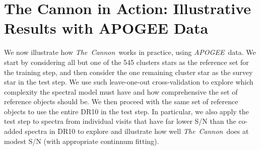 \documentclass[12pt, preprint]{aastex}
\newcommand{\tc}{\textsl{The~Cannon}}
\newcommand{\apogee}{\textsl{APOGEE}}
\begin{document}
\section{The Cannon in Action: Illustrative Results with APOGEE Data}
\label{sec:results}


We now illustrate how \tc\ works in practice, using \apogee\  data.
We start by considering all but one of the 545 clusters stars as the reference set for the training step, and then consider the one remaining cluster star as the survey star in the test step. We use such leave-one-out cross-validation to explore which complexity the spectral model must have and how comprehensive the set of reference objects should be. We then proceed with the same set of reference objects to use the entire DR10 in the test step. In particular, we also apply the test step to spectra from individual visits that have far lower S/N than the co-added spectra in DR10 to explore and illustrate how well \tc\ does at modest S/N (with appropriate continnum fitting).


\end{document}
